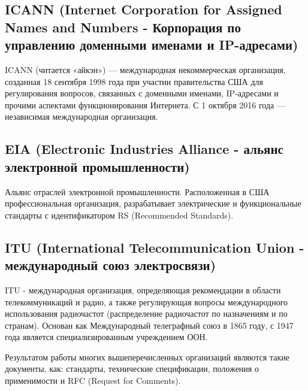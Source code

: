 \subsection{ICANN (Internet Corporation for Assigned Names and Numbers - Корпорация по управлению доменными именами и IP-адресами)}
ICANN (читается «айкэн») — международная некоммерческая организация, созданная 18
сентября 1998 года при участии правительства США для регулирования вопросов, связанных с
доменными именами, IP-адресами и прочими аспектами функционирования Интернета.
С 1 октября 2016 года — независимая международная организация.

\subsection{EIA (Electronic Industries Alliance - альянс электронной промышленности)}
Альянс отраслей электронной промышленности. Расположенная в США профессиональная организация, разрабатывает электрические и функциональные стандарты с
идентификатором RS (Recommended Standards).

\subsection{ITU (International Telecommunication Union - международный союз электросвязи)}
ITU - международная организация, определяющая рекомендации в области телекоммуникаций и радио, а также регулирующая вопросы международного использования
радиочастот (распределение радиочастот по назначениям и по странам). Основан как
Международный телеграфный союз в 1865 году, с 1947 года является специализированным
учреждением ООН.


Результатом
работы многих вышеперечисленных организаций являются такие документы, как: стандарты,
технические спецификации, положения о применимости и RFC (Request for Comments).
\endinput